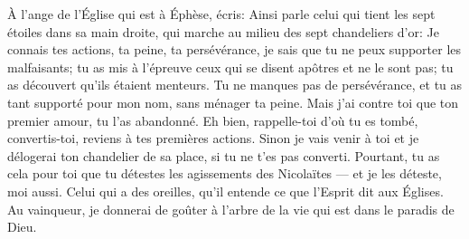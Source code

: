 À l’ange de l’Église qui est à Éphèse, écris:
	Ainsi parle celui qui tient les sept étoiles dans sa main droite,
	qui marche au milieu des sept chandeliers d’or:
	Je connais tes actions, ta peine, ta persévérance,
	je sais que tu ne peux supporter les malfaisants;
	tu as mis à l’épreuve ceux qui se disent apôtres et ne le sont pas;
	tu as découvert qu’ils étaient menteurs.
Tu ne manques pas de persévérance,
	et tu as tant supporté pour mon nom, sans ménager ta peine.
	Mais j’ai contre toi que ton premier amour, tu l’as abandonné.
Eh bien, rappelle-toi d’où tu es tombé,
	convertis-toi, reviens à tes premières actions.
Sinon je vais venir à toi
	et je délogerai ton chandelier de sa place, si tu ne t’es pas converti.
Pourtant, tu as cela pour toi que tu détestes les agissements des Nicolaïtes
	--- et je les déteste, moi aussi.
Celui qui a des oreilles, qu’il entende ce que l’Esprit dit aux Églises.
Au vainqueur, je donnerai de goûter à l’arbre de la vie
	qui est dans le paradis de Dieu.
